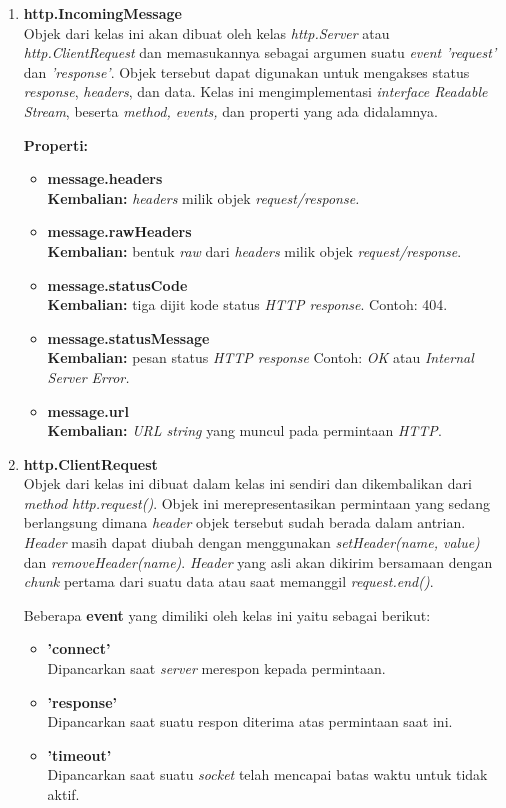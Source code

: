 \begin{enumerate}
	\item \textbf{http.IncomingMessage} \\ 
	Objek dari kelas ini akan dibuat oleh kelas \textit{http.Server} atau \textit{http.ClientRequest} dan memasukannya sebagai argumen suatu \textit{event} \textit{'request'} dan \textit{'response'}. Objek tersebut dapat digunakan untuk mengakses status \textit{response}, \textit{headers}, dan data. Kelas ini mengimplementasi \textit{interface Readable Stream}, beserta \textit{method, events,} dan properti yang ada didalamnya.
	
	\textbf{Properti:}
	\begin{itemize}
		\item \textbf{message.headers} \\ \textbf{Kembalian:} \textit{headers} milik objek \textit{request/response.}
		\item \textbf{message.rawHeaders} \\ \textbf{Kembalian:} bentuk \textit{raw} dari \textit{headers} milik objek \textit{request/response}.
		\item \textbf{message.statusCode} \\ \textbf{Kembalian:} tiga dijit kode status \textit{HTTP response}. Contoh: 404.
		\item \textbf{message.statusMessage} \\ \textbf{Kembalian:} pesan status \textit{HTTP response} Contoh: \textit{OK} atau \textit{Internal Server Error.}
		\item \textbf{message.url} \\ \textbf{Kembalian:} \textit{URL string} yang muncul pada permintaan \textit{HTTP}.
	\end{itemize}

	\item \textbf{http.ClientRequest} \\ 
	Objek dari kelas ini dibuat dalam kelas ini sendiri dan dikembalikan dari \textit{method http.request()}. Objek ini merepresentasikan permintaan yang sedang berlangsung dimana \textit{header} objek tersebut sudah berada dalam antrian. \textit{Header} masih dapat diubah dengan menggunakan \textit{setHeader(name, value)} dan \textit{removeHeader(name)}. \textit{Header} yang asli akan dikirim bersamaan dengan \textit{chunk} pertama dari suatu data atau saat memanggil \textit{request.end()}.
	
	Beberapa \textbf{event} yang dimiliki oleh kelas ini yaitu sebagai berikut:
		\begin{itemize}
			\item \textbf{'connect'} \\ Dipancarkan saat \textit{server} merespon kepada permintaan.
			\item \textbf{'response'} \\ Dipancarkan saat suatu respon diterima atas permintaan saat ini.
			\item \textbf{'timeout'} \\ Dipancarkan saat suatu \textit{socket} telah mencapai batas waktu untuk tidak aktif.
		\end{itemize}


\end{enumerate}
